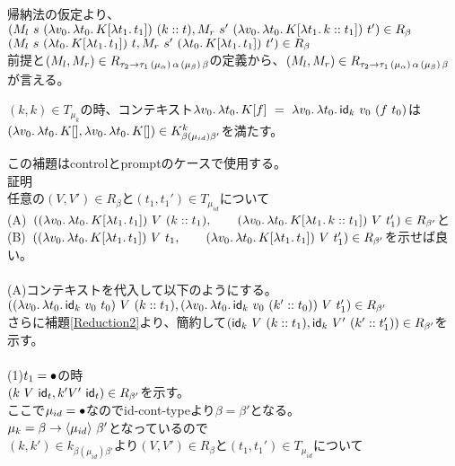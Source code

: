  帰納法の仮定より、\\
 $(M_l\ s \ \LamP{v_0}{\Lam{t_0}{K[\Lam{t_1}{t_1}]}}\ \ConsP{k}{t}, M_r\ s' \ \LamP{v_0}{\Lam{t_0}{K[\Lam{t_1}{\Cons{k}{t_1}}]}}\ t')\in R_{\beta}$\\
 $(M_l\ s \ \LamP{t_0}{K[\Lam{t_1}{t_1}]}\ t, M_r\ s' \ \LamP{t_0}{K[\Lam{t_1}{t_1}]}\ t')\in R_{\beta}$\\
 前提と$(M_l, M_r) \in R_{\TypeArrow{\tau_2}{\tau_1}{\mu_{\alpha}}{\alpha}{\mu_{\beta}}{\beta}}$の定義から、$(M_l, M_r) \in R_{\TypeArrow{\tau_2}{\tau_1}{\mu_{\alpha}}{\alpha}{\mu_{\beta}}{\beta}}$が言える。
\\
\begin{lemma}
  $(k,k)\in T_{\mu_k}$の時、コンテキスト$\Lam{v_0}{\Lam{t_0}{K[f]}}\ =\ \Lam{v_0}{\Lam{t_0}{\Idk\ v_0\ (f\ t_0)}}$は\\$(\Lam{v_0}{\Lam{t_0}{K[]}}, \Lam{v_0}{\Lam{t_0}{K[]}})\in  K^k_{\beta(\mu_{id})\beta'}$を満たす。
\label{IdkContext}
\end{lemma}
この補題はcontrolとpromptのケースで使用する。
\\
\lbrack 証明 \rbrack\\
任意の$(V,V')\in R_{\beta}$と$(t_1,t_1')\in T_{\mu_{id}}$について\\
(A)\ $(\LamP{v_0}{\Lam{t_0}{K[\Lam{t_1}{t_1}]}}\ V\ (\Cons{k}{t_1}),
\qquad \LamP{v_0}{\Lam{t_0}{K[\Lam{t_1}{\Cons{k}{t_1}}]}}\ V\ t_1')\in R_{\beta'}$と\\
(B)\ $(\LamP{v_0}{\Lam{t_0}{K[\Lam{t_1}{t_1}]}}\ V\ t_1,
\qquad \LamP{v_0}{\Lam{t_0}{K[\Lam{t_1}{t_1}]}}\ V\ t_1')\in R_{\beta'}$を示せば良い。\\
\\
(A)コンテキストを代入して以下のようにする。\\
$(\LamP{v_0}{\Lam{t_0}{\Idk\ v_0\ t_0}}\ V\ (\Cons{k}{t_1}),
\LamP{v_0}{\Lam{t_0}{\Idk\ v_0\ (\Cons{k'}{t_0})}}\ V\ t_1')\in R_{\beta'}$\\
さらに補題\ref{Reduction2}より、簡約して$(\Idk\ V\ (\Cons{k}{t_1}),\Idk\ V'\ (\Cons{k'}{t_1'}))\in R_{\beta'}$を示す。\\
\\
(1)$t_1=\Bullet$の時\\
$(k\ V\ \Idt,k' V'\ \Idt)\in R_{\beta'}$を示す。\\
ここで$\mu_{id}=\Bullet$なので\textsf{id-cont-type}より$\beta=\beta'$となる。\\
$\mu_k = \Trail{\beta}{\beta'}{\mu_{id}}$となっているので\\
$(k,k')\in k_{\beta(\mu_{id})\beta'}$より$(V,V')\in R_{\beta}$と$(t_1,t_1')\in T_{\mu_{id}}$について\\
